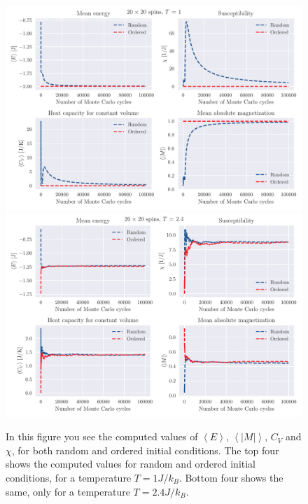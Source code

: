 \documentclass[reprint, english,notitlepage,nofootinbib]{revtex4-1}  %
\begin{document}
\begin{figure}[!htb]
	\includegraphics[width=16cm]{../output/de/L20-T1-dT0_0-NT1-N5-ExpVals.pdf}
	\includegraphics[width=16cm]{../output/de/L20-T2_4-dT0_0-NT1-N5-ExpVals.pdf}
	\caption{In this figure you see the computed values of $\left<E\right>$, $\left<|M|\right>$, $C_V$ and $\chi$, for both random and ordered initial conditions. The top four shows the computed values for random and ordered initial conditions, for a temperature $T=1J/k_B$. Bottom four shows the same, only for a temperature $T=2.4J/k_B$.}
	\label{fig:L20_T1_and_T2_4}
\end{figure}
\end{document}
